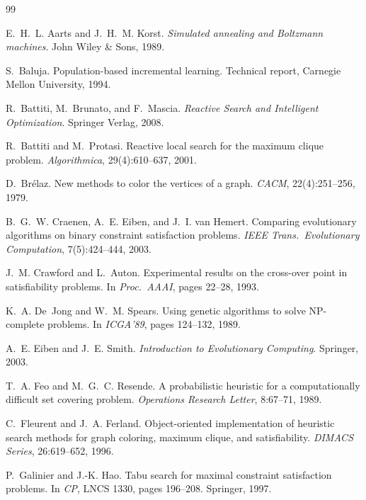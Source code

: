 \documentclass[12pt,a4paper]{book}
\begin{document}

\begin{thebibliography}{99}

E.~H.~L. Aarts and J.~H.~M. Korst.
\newblock \textit{Simulated annealing and Boltzmann machines}.
\newblock John Wiley \& Sons, 1989.

S.~Baluja.
\newblock Population-based incremental learning.
\newblock Technical report, Carnegie Mellon University, 1994.

R.~Battiti, M.~Brunato, and F.~Mascia.
\newblock \textit{Reactive Search and Intelligent Optimization}.
\newblock Springer Verlag, 2008.

R.~Battiti and M.~Protasi.
\newblock Reactive local search for the maximum clique problem.
\newblock \textit{Algorithmica}, 29(4):610--637, 2001.

D.~Brélaz.
\newblock New methods to color the vertices of a graph.
\newblock \textit{CACM}, 22(4):251--256, 1979.

B.~G.~W. Craenen, A.~E. Eiben, and J.~I. van Hemert.
\newblock Comparing evolutionary algorithms on binary constraint satisfaction problems.
\newblock \textit{IEEE Trans.\ Evolutionary Computation}, 7(5):424--444, 2003.

J.~M. Crawford and L.~Auton.
\newblock Experimental results on the cross-over point in satisfiability problems.
\newblock In \textit{Proc.\ AAAI}, pages 22--28, 1993.

K.~A. De~Jong and W.~M. Spears.
\newblock Using genetic algorithms to solve NP-complete problems.
\newblock In \textit{ICGA'89}, pages 124--132, 1989.

A.~E. Eiben and J.~E. Smith.
\newblock \textit{Introduction to Evolutionary Computing}.
\newblock Springer, 2003.

T.~A. Feo and M.~G.~C. Resende.
\newblock A probabilistic heuristic for a computationally difficult set covering problem.
\newblock \textit{Operations Research Letter}, 8:67--71, 1989.

C.~Fleurent and J.~A. Ferland.
\newblock Object-oriented implementation of heuristic search methods for graph coloring, maximum clique, and satisfiability.
\newblock \textit{DIMACS Series}, 26:619--652, 1996.

P.~Galinier and J.-K. Hao.
\newblock Tabu search for maximal constraint satisfaction problems.
\newblock In \textit{CP}, LNCS 1330, pages 196--208. Springer, 1997.


\end{thebibliography}
\end{document}
